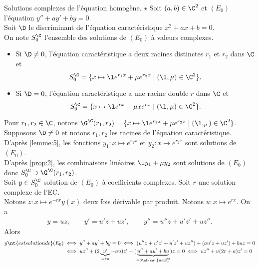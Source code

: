 \documentclass[11pt]{article}
\begin{document}
\begin{thm}{Solutions complexes de l'équation homogène. $\star$}{}
    Soit $(a,b)\in\C^2$ et $(E_0)$ l'équation $y''+ay'+by=0$.\\
    Soit $\D$ le discriminant de l'équation caractéristique $x^2+ax+b=0$.\\
    On note $S_0^\C$ l'ensemble des solutions de $(E_0)$ à valeurs complexes.
    \begin{itemize}
        \item Si $\D\neq0$, l'équation caractéristique a deux racines distinctes $r_1$ et $r_2$ dans $\C$ et
        \begin{equation*}
            S_0^\C=\{x\mapsto\l e^{r_1x}+\mu e^{r_2x} \mid (\l,\mu)\in \C^2\}.
        \end{equation*}
        \item Si $\D=0$, l'équation caractéristique a une racine double $r$ dans $\C$ et
        \begin{equation*}
            S_0^\C=\{x\mapsto \l e^{rx} + \mu x e^{rx} \mid (\l, \mu) \in \C^2\}.
        \end{equation*}
    \end{itemize}
    \tcblower
    Pour $r_1,r_2\in\C$, notons $\G^\C(r_1,r_2)=\{x\mapsto \l e^{r_1x}+\mu e^{r_2x}\mid (\l,_\mu)\in\C^2\}$.\\
    \boxed{\supset} Supposons $\D\neq0$ et notons $r_1,r_2$ les racines de l'équation caractéristique.\\
    D'après \ref{lemme:5}, les fonctions $y_1:x\mapsto e^{r_1x}$ et $y_2:x\mapsto e^{r_2x}$ sont solutions de $(E_0)$.\\
    D'après \ref{prop:2}, les combinaisons linéaires $\l y_1 + \mu y_2$ sont solutions de $(E_0)$ donc $S_0^\C\supset \G^\C(r_1,r_2)$.\\
    \boxed{\subset} Soit $y\in S_0^\C$ solution de $(E_0)$ à coefficients complexes. Soit $r$ une solution complexe de l'EC.\\
    Notons $z:x\mapsto e^{-rx}y(x)$ deux fois dérivable par produit. Notons $u:x\mapsto e^{rx}$. On a
    \begin{align*}
        y=uz, \qquad y'=u'z+uz', \qquad y'' = u''z+u'z' + uz''.
    \end{align*}
    Alors
    \begin{align*}
        y \nt{ est solution de } (E_0) &\iff y''+ay'+by=0 \iff (u''z+u'z'+u'z'+uz'') + (au'z+uz')+buz=0\\
        &\iff uz''+(2\underbrace{u'}_{=ru}+au)z'+(\underbrace{u''+au'+bu}_{=0\nt{ car }u\in S_0^\C})z=0 \iff uz'' + u(2r+a)z'=0\\

\end{align*}
\end{thm}
\end{document}
